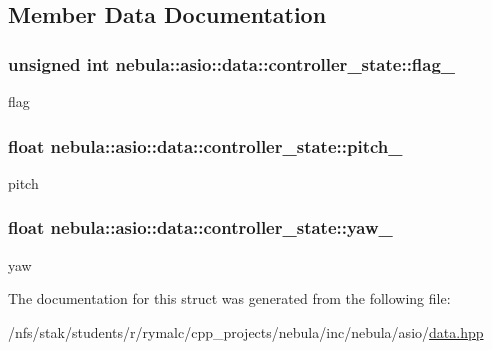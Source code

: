 \subsection{Member Data Documentation}
\hypertarget{structnebula_1_1asio_1_1data_1_1controller__state_a3198c5698b341c2b5c69448ed040df55}{
\subsubsection[{flag\_\-}]{\setlength{\rightskip}{0pt plus 5cm}unsigned int {\bf nebula::asio::data::controller\_\-state::flag\_\-}}}
\label{structnebula_1_1asio_1_1data_1_1controller__state_a3198c5698b341c2b5c69448ed040df55}
flag \hypertarget{structnebula_1_1asio_1_1data_1_1controller__state_a72667482c3ad17c4140e5046bf7badb8}{
\subsubsection[{pitch\_\-}]{\setlength{\rightskip}{0pt plus 5cm}float {\bf nebula::asio::data::controller\_\-state::pitch\_\-}}}
\label{structnebula_1_1asio_1_1data_1_1controller__state_a72667482c3ad17c4140e5046bf7badb8}
pitch \hypertarget{structnebula_1_1asio_1_1data_1_1controller__state_abd23e8dac5a7c0cc6a764315d9e66195}{
\subsubsection[{yaw\_\-}]{\setlength{\rightskip}{0pt plus 5cm}float {\bf nebula::asio::data::controller\_\-state::yaw\_\-}}}
\label{structnebula_1_1asio_1_1data_1_1controller__state_abd23e8dac5a7c0cc6a764315d9e66195}
yaw 

The documentation for this struct was generated from the following file:\begin{DoxyCompactItemize}
\item 
/nfs/stak/students/r/rymalc/cpp\_\-projects/nebula/inc/nebula/asio/\hyperlink{data_8hpp}{data.hpp}\end{DoxyCompactItemize}
